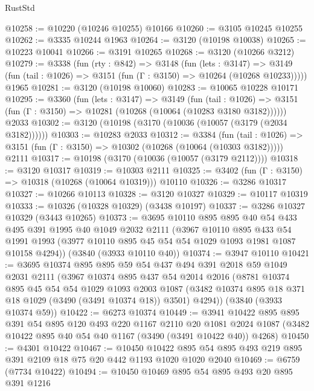 \begin{lexlean}{RustStd}
\begin{coremodule}
@10258 := @10220 (@10246 @10255) @10166
@10260 := @3105 @10245 @10255
@10262 := @3335 @10244 @1963
@10264 := @3120 (@10198 @10038)
@10265 := @10223 @10041
@10266 := @3191 @10265
@10268 := @3120 (@10266 @3212)
@10279 := @3338
    (fun (rty : @842) =>
    @3148
      (fun (lets : @3147) =>
      @3149 (fun (tail : @1026) => @3151 (fun (Γ : @3150) => @10264 (@10268 @10233)))))
    @1965
@10281 := @3120 (@10198 @10060)
@10283 := @10065 @10228 @10171
@10295 := @3360
    (fun (lets : @3147) =>
    @3149
      (fun (tail : @1026) =>
      @3151 (fun (Γ : @3150) => @10281 (@10268 (@10064 (@10283 @3180 @3182))))))
    @2033
@10302 := @3120 (@10198 (@3170 (@10036 (@10057 (@3179 (@2034 @3182))))))
@10303 := @10283 @2033
@10312 := @3384
    (fun (tail : @1026) => @3151 (fun (Γ : @3150) => @10302 (@10268 (@10064 (@10303 @3182)))))
    @2111
@10317 := @10198 (@3170 (@10036 (@10057 (@3179 @2112))))
@10318 := @3120 @10317
@10319 := @10303 @2111
@10325 := @3402 (fun (Γ : @3150) => @10318 (@10268 (@10064 @10319))) @10110
@10326 := @3286 @10317
@10327 := @10266 @10113
@10328 := @3120 @10327
@10329 := @10117 @10319
@10333 := @10326 (@10328 @10329) (@3438 @10197)
@10337 := @3286 @10327 @10329 (@3443 @10265)
@10373 := @3695
    @10110
    @895
    @895
    @40
    @54
    @433
    @495
    @391
    @1995
    @40
    @1049
    @2032
    @2111
    (@3967
      @10110
      @895
      @433
      @54
      @1991
      @1993
      (@3977 @10110 @895 @45 @54 @54 @1029 @1093 @1981 @1087 @10158 @4294))
    (@3840 (@3933 @10110 @40))
@10374 := @3947 @10110
@10421 := @3695
    @10374
    @895
    @895
    @59
    @54
    @437
    @494
    @391
    @2018
    @59
    @1049
    @2031
    @2111
    (@3967
      @10374
      @895
      @437
      @54
      @2014
      @2016
      (@8781
        @10374
        @895
        @45
        @54
        @54
        @1029
        @1093
        @2003
        @1087
        (@3482 @10374 @895 @18 @371 @18 @1029 (@3490 (@3491 @10374 @18)) @3501)
        @4294))
    (@3840 (@3933 @10374 @59))
@10422 := @6273 @10374
@10449 := @3941
    @10422
    @895
    @895
    @391
    @54
    @895
    @120
    @493
    @220
    @1167
    @2110
    @20
    @1081
    @2024
    @1087
    (@3482 @10422 @895 @40 @54 @40 @1167 (@3490 (@3491 @10422 @40)) @4268)
@10450 := @4301 @10422
@10467 := @10450
    @10422
    @895
    @54
    @895
    @493
    @219
    @895
    @391
    @2109
    @18
    @75
    @20
    @442
    @1193
    @1020
    @1020
    @2040
@10469 := @6759 (@7734 @10422)
@10494 := @10450
    @10469
    @895
    @54
    @895
    @493
    @20
    @895
    @391
    @1216

\end{coremodule}
\end{lexlean}
